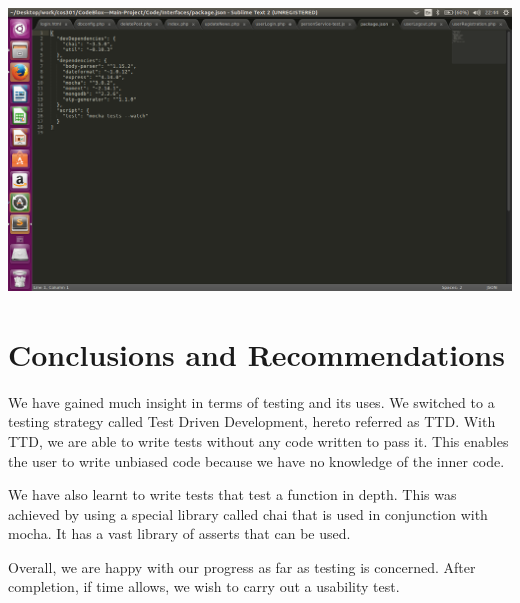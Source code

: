 \documentclass[a4paper,12pt]{article}
\begin{document}
				\includegraphics[width=1\textwidth]{./Pictures/3.png}\\[1.5cm] \newline
				
	\section{Conclusions and Recommendations}
	We have gained much insight in terms of testing and its uses. We switched to a testing strategy called Test Driven Development, hereto referred as TTD. With TTD, we are able to write tests without any code written to pass it. This enables the user to write unbiased code because we have no knowledge of the inner code. 
	
	We have also learnt to write tests that test a function in depth. This was achieved by using a special library called chai that is used in conjunction with mocha. It has a vast library of asserts that can be used.
	
	Overall, we are happy with our progress as far as testing is concerned. After completion, if time allows, we wish to carry out a usability test.
				
			
			
			
			
			
		
		
		
		
		
\end{document}
